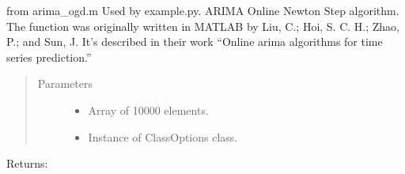 \documentclass[letterpaper,10pt,english]{sphinxmanual}
\begin{document}
\begin{fulllineitems}
\label{\detokenize{LDS:LDS.OnlineLDS_library.arima_ogd}}
\sphinxAtStartPar
from arima\_ogd.m
Used by example.py. ARIMA Online Newton Step algorithm.
The function was originally written in MATLAB by Liu, C.; Hoi, S. C. H.; Zhao, P.; and Sun, J.
It’s described in their work “Online arima algorithms for time series prediction.”
\begin{quote}\begin{description}
\item[{Parameters}] \leavevmode\begin{itemize}
\item {} 
\sphinxAtStartPar
{} \textendash{} Array of 10000 elements.

\item {} 
\sphinxAtStartPar
{} \textendash{} Instance of ClassOptions class.

\end{itemize}

\end{description}\end{quote}

\sphinxAtStartPar
Returns:

\end{fulllineitems}

\end{document}
